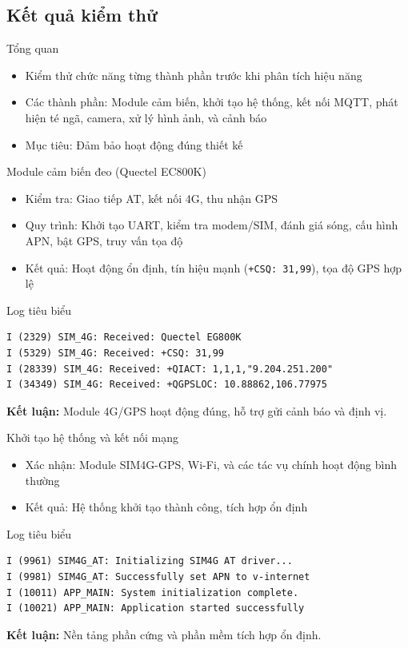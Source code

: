 
\subsection{Kết quả kiểm thử}
\begin{frame}{Tổng quan}
    \begin{itemize}
        \item Kiểm thử chức năng từng thành phần trước khi phân tích hiệu năng
        \item Các thành phần: Module cảm biến, khởi tạo hệ thống, kết nối MQTT, phát hiện té ngã, camera, xử lý hình ảnh, và cảnh báo
        \item Mục tiêu: Đảm bảo hoạt động đúng thiết kế
    \end{itemize}
\end{frame}

\begin{frame}[fragile]{Module cảm biến đeo (Quectel EC800K)}
    \begin{itemize}
        \item Kiểm tra: Giao tiếp AT, kết nối 4G, thu nhận GPS
        \item Quy trình: Khởi tạo UART, kiểm tra modem/SIM, đánh giá sóng, cấu hình APN, bật GPS, truy vấn tọa độ
        \item Kết quả: Hoạt động ổn định, tín hiệu mạnh (\texttt{+CSQ: 31,99}), tọa độ GPS hợp lệ
    \end{itemize}
    \begin{block}{Log tiêu biểu}
        \begin{verbatim}
I (2329) SIM_4G: Received: Quectel EG800K
I (5329) SIM_4G: Received: +CSQ: 31,99
I (28339) SIM_4G: Received: +QIACT: 1,1,1,"9.204.251.200"
I (34349) SIM_4G: Received: +QGPSLOC: 10.88862,106.77975
        \end{verbatim}
    \end{block}
    \textbf{Kết luận:} Module 4G/GPS hoạt động đúng, hỗ trợ gửi cảnh báo và định vị.
\end{frame}

\begin{frame}[fragile]{Khởi tạo hệ thống và kết nối mạng}
    \begin{itemize}
        \item Xác nhận: Module SIM4G-GPS, Wi-Fi, và các tác vụ chính hoạt động bình thường
        \item Kết quả: Hệ thống khởi tạo thành công, tích hợp ổn định
    \end{itemize}
    \begin{block}{Log tiêu biểu}
        \begin{verbatim}
I (9961) SIM4G_AT: Initializing SIM4G AT driver...
I (9981) SIM4G_AT: Successfully set APN to v-internet
I (10011) APP_MAIN: System initialization complete.
I (10021) APP_MAIN: Application started successfully
        \end{verbatim}
    \end{block}
    \textbf{Kết luận:} Nền tảng phần cứng và phần mềm tích hợp ổn định.
\end{frame}

